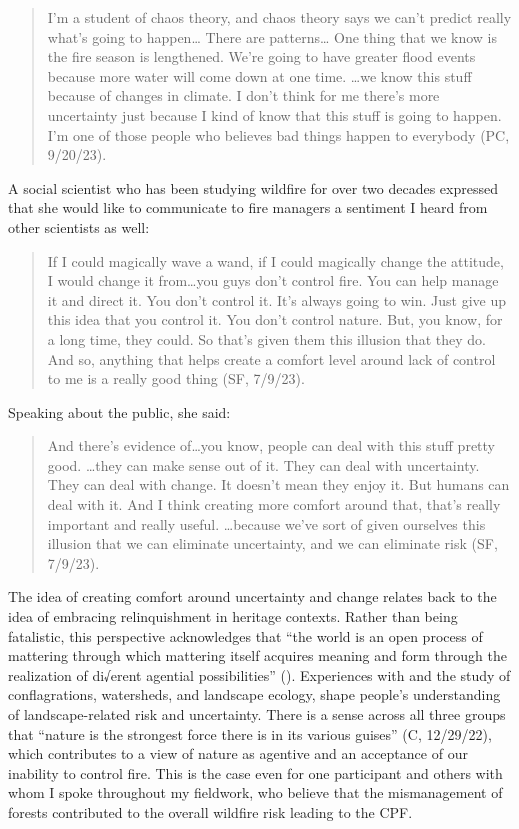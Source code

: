 \documentclass[
]{article}
\begin{document}
\begin{quote}
I'm a student of chaos theory, and chaos theory says we can't predict really what's going to happen\ldots{} There are patterns\ldots{} One thing that we know is the fire season is lengthened. We're going to have greater flood events because more water will come down at one time. \ldots we know this stuff because of changes in climate. I don't think for me there's more uncertainty just because I kind of know that this stuff is going to happen. I'm one of those people who believes bad things happen to everybody (PC, 9/20/23).
\end{quote}

A social scientist who has been studying wildfire for over two decades expressed that she would like to communicate to fire managers a sentiment I heard from other scientists as well:

\begin{quote}
If I could magically wave a wand, if I could magically change the attitude, I would change it from\ldots you guys don't control fire. You can help manage it and direct it. You don't control it. It's always going to win. Just give up this idea that you control it. You don't control nature. But, you know, for a long time, they could. So that's given them this illusion that they do. And so, anything that helps create a comfort level around lack of control to me is a really good thing (SF, 7/9/23).
\end{quote}

Speaking about the public, she said:

\begin{quote}
And there's evidence of\ldots you know, people can deal with this stuff pretty good. \ldots they can make sense out of it. They can deal with uncertainty. They can deal with change. It doesn't mean they enjoy it. But humans can deal with it. And I think creating more comfort around that, that's really important and really useful. \ldots because we've sort of given ourselves this illusion that we can eliminate uncertainty, and we can eliminate risk (SF, 7/9/23).
\end{quote}

The idea of creating comfort around uncertainty and change relates back to the idea of embracing relinquishment in heritage contexts. Rather than being fatalistic, this perspective acknowledges that ``the world is an open process of mattering through which mattering itself acquires meaning and form through the realization of di√erent agential possibilities'' (). Experiences with and the study of conflagrations, watersheds, and landscape ecology, shape people's understanding of landscape-related risk and uncertainty. There is a sense across all three groups that ``nature is the strongest force there is in its various guises'' (C, 12/29/22), which contributes to a view of nature as agentive and an acceptance of our inability to control fire. This is the case even for one participant and others with whom I spoke throughout my fieldwork, who believe that the mismanagement of forests contributed to the overall wildfire risk leading to the CPF.
\end{document}

